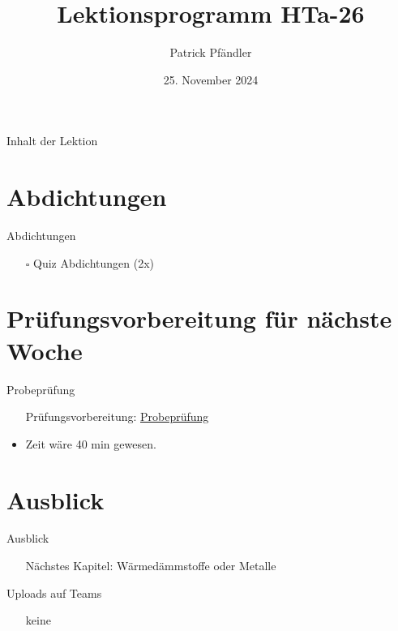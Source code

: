 



\title{\textbf{Lektionsprogramm HTa-26}}
\author{Patrick Pfändler}
\date{25. November 2024}




\frame{\titlepage}

\begin{frame}{Inhalt der Lektion}
	\tableofcontents
\end{frame}



\section{Abdichtungen}
\begin{frame}{Abdichtungen}
	\begin{itemize}
		\item [$\square$]Quiz Abdichtungen (2x)
	\end{itemize}
\end{frame}

\section{Prüfungsvorbereitung für nächste Woche}
\begin{frame}{Probeprüfung}
	\begin{itemize}
		\item [\textbullet] Prüfungsvorbereitung:  \href{https://www.classtime.com/code/GVASU5}{Probeprüfung}
		\item Zeit wäre 40 min gewesen.
	\end{itemize}
\end{frame}






\section{Ausblick}
\begin{frame}{Ausblick}
	\begin{itemize}
		\item[\textbullet] Nächstes Kapitel: Wärmedämmstoffe oder Metalle
	\end{itemize}
\end{frame}

\begin{frame}{Uploads auf Teams}
	\begin{itemize}
		\item[\textbullet] keine
	\end{itemize}
	    
\end{frame}

\folieFragen

